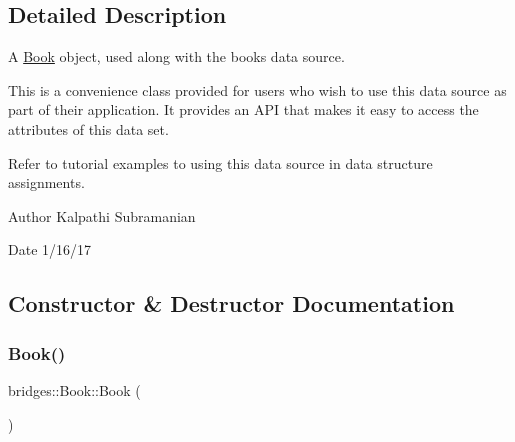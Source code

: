 \subsection{Detailed Description}
A \mbox{\hyperlink{classbridges_1_1_book}{Book}} object, used along with the books data source. 

This is a convenience class provided for users who wish to use this data source as part of their application. It provides an A\+PI that makes it easy to access the attributes of this data set.

Refer to tutorial examples to using this data source in data structure assignments.

\begin{DoxyAuthor}{Author}
Kalpathi Subramanian 
\end{DoxyAuthor}
\begin{DoxyDate}{Date}
1/16/17 
\end{DoxyDate}


\subsection{Constructor \& Destructor Documentation}
\mbox{\label{classbridges_1_1_book_abb2903c640bd263a2e077d52e12a773e}} 
\subsubsection{\texorpdfstring{Book()}{Book()}\hspace{0.1cm}{\footnotesize\ttfamily [1/2]}}
{\footnotesize\ttfamily bridges\+::\+Book\+::\+Book (\begin{DoxyParamCaption}{ }\end{DoxyParamCaption})\hspace{0.3cm}{\ttfamily [inline]}}

\mbox{\label{classbridges_1_1_book_a4256eb5015b42e511d950c45103cef63}} 
